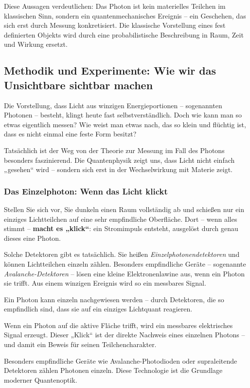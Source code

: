 \medskip

Diese Aussagen verdeutlichen: Das Photon ist kein materielles Teilchen im klassischen Sinn, sondern ein quantenmechanisches Ereignis – ein Geschehen, das sich erst durch Messung konkretisiert. Die klassische Vorstellung eines fest definierten Objekts wird durch eine probabilistische Beschreibung in Raum, Zeit und Wirkung ersetzt.



\subsection{Methodik und Experimente: Wie wir das  Unsichtbare sichtbar machen}

Die Vorstellung, dass Licht aus winzigen Energieportionen – sogenannten Photonen – besteht, klingt heute fast selbstverständlich. Doch wie kann man so etwas eigentlich messen? Wie weist man etwas nach, das so klein und flüchtig ist, dass es nicht einmal eine feste Form besitzt?

Tatsächlich ist der Weg von der Theorie zur Messung im Fall des Photons besonders faszinierend. Die Quantenphysik zeigt uns, dass Licht nicht einfach „gesehen“ wird – sondern sich erst in der Wechselwirkung mit Materie zeigt.

\subsubsection{Das Einzelphoton: Wenn das Licht klickt}
Stellen Sie sich vor, Sie dunkeln einen Raum vollständig ab und schießen nur ein einziges Lichtteilchen auf eine sehr empfindliche Oberfläche. Dort – wenn alles stimmt – \textbf{macht es „klick“}: ein Stromimpuls entsteht, ausgelöst durch genau dieses eine Photon.

Solche Detektoren gibt es tatsächlich. Sie heißen \textit{Einzelphotonendetektoren} und können Lichtteilchen einzeln zählen. Besonders empfindliche Geräte – sogenannte \textit{Avalanche-Detektoren} – lösen eine kleine Elektronenlawine aus, wenn ein Photon sie trifft. Aus einem winzigen Ereignis wird so ein messbares Signal.
\medskip
\begin{tcolorbox}[physikbox, title=Das einzelne Photon – wenn es klickt]
	\label{box:einzelphoton}
	Ein Photon kann einzeln nachgewiesen werden – durch Detektoren, die so empfindlich sind, dass sie auf ein einziges Lichtquant reagieren.
	
	Wenn ein Photon auf die aktive Fläche trifft, wird ein messbares elektrisches Signal erzeugt. Dieser „Klick“ ist der direkte Nachweis eines einzelnen Photons – und damit ein Beweis für seinen Teilchencharakter.
	
	Besonders empfindliche Geräte wie Avalanche-Photodioden oder supraleitende Detektoren zählen Photonen einzeln. Diese Technologie ist die Grundlage moderner Quantenoptik.
\end{tcolorbox}
\medskip

